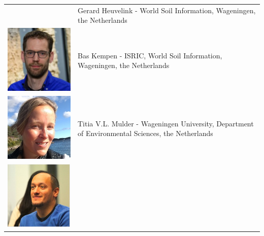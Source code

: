 \documentclass[10pt,b5paper,]{book}
\theoremstyle{definition}
\theoremstyle{definition}
\theoremstyle{definition}
\theoremstyle{remark}
\begin{document}
\begin{longtable}[]{@{}ll@{}}
\begin{minipage}[t]{0.11\columnwidth}
\end{minipage} & \begin{minipage}[t]{0.83\columnwidth}\raggedright
Gerard Heuvelink - World Soil Information, Wageningen, the
Netherlands\strut
\end{minipage}\tabularnewline
\begin{minipage}[t]{0.11\columnwidth}\raggedright
\includegraphics{contrAuthors/Kempen.jpg}\strut
\end{minipage} & \begin{minipage}[t]{0.83\columnwidth}\raggedright
Bas Kempen - ISRIC, World Soil Information, Wageningen, the
Netherlands\strut
\end{minipage}\tabularnewline
\begin{minipage}[t]{0.11\columnwidth}\raggedright
\includegraphics{contrAuthors/Mulder.jpeg}\strut
\end{minipage} & \begin{minipage}[t]{0.83\columnwidth}\raggedright
Titia V.L. Mulder - Wageningen University, Department of Environmental
Sciences, the Netherlands\strut
\end{minipage}\tabularnewline
\begin{minipage}[t]{0.11\columnwidth}\raggedright
\includegraphics{contrAuthors/Olmedo.png}\strut

\end{minipage}
\end{longtable}
\end{document}
